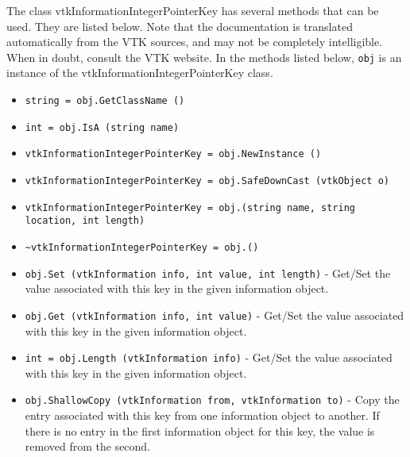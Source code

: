 The class vtkInformationIntegerPointerKey has several methods that can be used.
  They are listed below.
Note that the documentation is translated automatically from the VTK sources,
and may not be completely intelligible.  When in doubt, consult the VTK website.
In the methods listed below, \verb|obj| is an instance of the vtkInformationIntegerPointerKey class.
\begin{itemize}
\item  \verb|string = obj.GetClassName ()|

\item  \verb|int = obj.IsA (string name)|

\item  \verb|vtkInformationIntegerPointerKey = obj.NewInstance ()|

\item  \verb|vtkInformationIntegerPointerKey = obj.SafeDownCast (vtkObject o)|

\item  \verb|vtkInformationIntegerPointerKey = obj.(string name, string location, int length)|

\item  \verb|~vtkInformationIntegerPointerKey = obj.()|

\item  \verb|obj.Set (vtkInformation info, int value, int length)| -  Get/Set the value associated with this key in the given
 information object.

\item  \verb|obj.Get (vtkInformation info, int value)| -  Get/Set the value associated with this key in the given
 information object.

\item  \verb|int = obj.Length (vtkInformation info)| -  Get/Set the value associated with this key in the given
 information object.

\item  \verb|obj.ShallowCopy (vtkInformation from, vtkInformation to)| -  Copy the entry associated with this key from one information
 object to another.  If there is no entry in the first information
 object for this key, the value is removed from the second.

\end{itemize}
